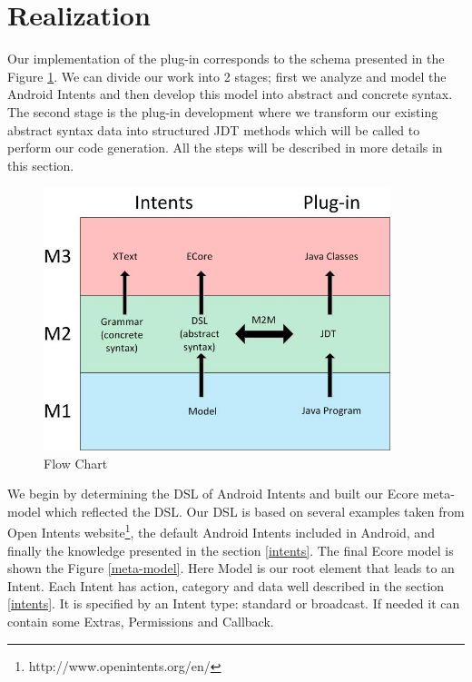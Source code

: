 \section{Realization}
\label{realisation}

Our implementation of the plug-in corresponds to the schema presented in the Figure \ref{flowchart}. We can divide our work into 2 stages; first we analyze and model the Android Intents and then develop this model into abstract and concrete syntax. The second stage is the plug-in development where we transform our existing abstract syntax data into structured JDT methods which will be called to perform our code generation. All the steps will be described in more details in this section.  

\begin{figure}[t]
\label{flowchart}
  \centering
    \includegraphics[width=0.9\textwidth]{flowchart}
  \caption{Flow Chart}
\end{figure}

We begin by determining the DSL of Android Intents and built our Ecore meta-model which reflected the DSL. Our DSL is based on several examples taken from Open Intents website\footnote{http://www.openintents.org/en/}, the default Android Intents included in Android, and finally the knowledge presented in the section \ref{intents}. The final Ecore model is shown the Figure \ref{meta-model}. Here Model is our root element that leads to an Intent. Each Intent has action, category and data well described in the section \ref{intents}. It is specified by an Intent type: standard or broadcast. If needed it can contain some Extras, Permissions and Callback.

